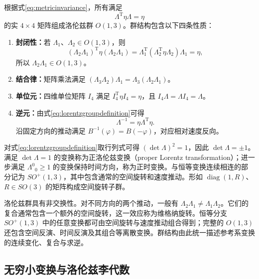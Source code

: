 \documentclass[style=classic,color=full]{lc-article}
\begin{document}
根据式\eqref{eq:metricinvariance}，所有满足
\begin{equation}
  \Lambda^{\mathrm T}\eta\Lambda=\eta
  \label{eq:lorentzgroupdefinition}
\end{equation}
的实 $4\times4$ 矩阵组成洛伦兹群 $O(1,3)$。群结构包含以下四条性质：
\begin{enumerate}
  \item \textbf{封闭性：}若 $\Lambda_1$、$\Lambda_2\in O(1,3)$，则
  \begin{equation}
    (\Lambda_2\Lambda_1)^{\mathrm T}\eta
    (\Lambda_2\Lambda_1)
    =\Lambda_1^{\mathrm T}
    (\Lambda_2^{\mathrm T}\eta\Lambda_2)
    \Lambda_1=\eta,
  \end{equation}
  所以 $\Lambda_2\Lambda_1\in O(1,3)$。

  \item \textbf{结合律：}矩阵乘法满足
  $(\Lambda_3\Lambda_2)\Lambda_1
  =\Lambda_3(\Lambda_2\Lambda_1)$。

  \item \textbf{单位元：}四维单位矩阵 $I_4$ 满足
  $I_4^{\mathrm T}\eta I_4=\eta$，且
  $I_4\Lambda=\Lambda I_4=\Lambda$。

  \item \textbf{逆元：}由式\eqref{eq:lorentzgroupdefinition}可得
  \begin{equation}
    \Lambda^{-1}=\eta\Lambda^{\mathrm T}\eta.
  \end{equation}
  沿固定方向的推动满足 $B^{-1}(\varphi)=B(-\varphi)$，对应相对速度反向。
\end{enumerate}

对式\eqref{eq:lorentzgroupdefinition}取行列式可得 $(\det\Lambda)^2=1$，因此 $\det\Lambda=\pm1$。满足 $\det\Lambda=1$ 的变换称为正洛伦兹变换（proper Lorentz transformation）；进一步满足 ${\Lambda^0}_{0}\ge1$ 的变换保持时间方向，称为正时变换。与恒等变换连续相连的部分记为 $SO^+(1,3)$，其中包含通常的空间旋转和速度推动。形如 $\operatorname{diag}(1,R)$、$R\in SO(3)$ 的矩阵构成空间旋转子群。

洛伦兹群具有非交换性。对不同方向的两个推动，一般有 $\Lambda_2\Lambda_1\neq\Lambda_1\Lambda_2$。它们的复合通常包含一个额外的空间旋转，这一效应称为维格纳旋转。恒等分支 $SO^+(1,3)$ 中的任意变换都可由空间旋转与速度推动组合得到；完整的 $O(1,3)$ 还包含空间反演、时间反演及其组合等离散变换。群结构由此统一描述参考系变换的连续变化、复合与求逆。

\subsection{无穷小变换与洛伦兹李代数}
\end{document}
